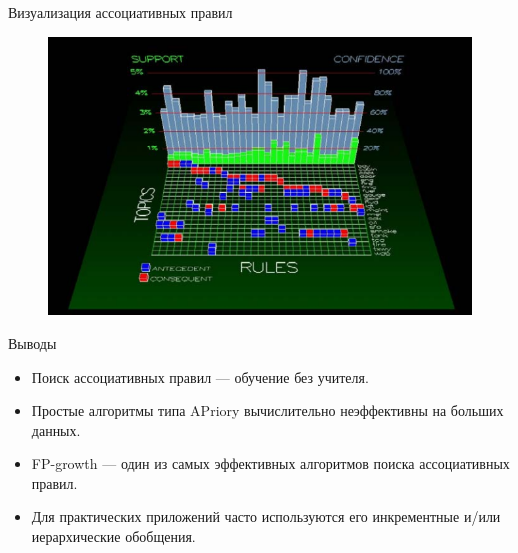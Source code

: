\documentclass{beamer}
\begin{document}
\begin{frame}{Визуализация ассоциативных правил}
	\begin{figure}[h]
		\centering
		\includegraphics[scale=0.6]{images/lec08-pic30.png}
	\end{figure}
\end{frame}

\begin{frame}{Выводы}
	\begin{itemize}
		\item Поиск ассоциативных правил — обучение без учителя.
		\item Простые алгоритмы типа APriory вычислительно неэффективны на больших данных.
		\item FP-growth — один из самых эффективных алгоритмов поиска ассоциативных правил.
		\item Для практических приложений часто используются его инкрементные и/или иерархические обобщения.
	\end{itemize}
\end{frame}
\end{document}
